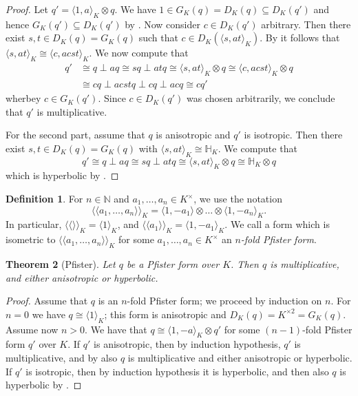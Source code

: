 \documentclass[12pt, leqno, british]{amsart}
\theoremstyle{definition}
\newtheorem{defi}{Definition}[subsection]
\theoremstyle{plain}
\newtheorem{thm}[defi]{Theorem}
\theoremstyle{remark}
\newcommand{\mbb}{\mathbb}
\newcommand{\nat}{\mbb N}
\newcommand{\llangle}{\langle\!\langle}
\newcommand{\rrangle}{\rangle\!\rangle}
\begin{document}
\begin{proof}
Let $q' = \langle 1, a \rangle_K \otimes q$. We have $1 \in G_K(q) = D_K(q) \subseteq D_K(q')$ and hence $G_K(q') \subseteq D_K(q')$ by .
Now consider $c \in D_K(q')$ arbitrary.
Then there exist $s, t \in D_K(q) = G_K(q)$ such that $c \in D_K(\langle s, at \rangle_K)$.
By  it follows that $\langle s, at \rangle_K \cong \langle c, acst \rangle_K$.
We now compute that
\begin{align*}
q' &\cong q \perp a q \cong sq \perp atq \cong \langle s, at \rangle_K \otimes q \cong \langle c, acst \rangle_K \otimes q \\
&\cong cq \perp acstq \perp cq \perp acq \cong cq'
\end{align*}
wherbey $c \in G_K(q')$.
Since $c \in D_K(q')$ was chosen arbitrarily, we conclude that $q'$ is multiplicative.

For the second part, assume that $q$ is anisotropic and $q'$ is isotropic.
Then there exist $s, t \in D_K(q) = G_K(q)$ with $\langle s, at \rangle_K \cong \mbb{H}_K$.
We compute that
$$ q' \cong q \perp aq \cong sq \perp atq \cong \langle s, at \rangle_K \otimes q \cong \mbb{H}_K \otimes q $$
which is hyperbolic by .
\end{proof}
\begin{defi}
For $n \in \nat$ and $a_1, \ldots, a_n \in K^\times$, we use the notation
$$ \llangle a_1, \ldots, a_n \rrangle_K = \langle 1, -a_1 \rangle \otimes \ldots \otimes \langle 1, -a_n \rangle_K. $$
In particular, $\llangle \rrangle_K = \langle 1 \rangle_K$, and $\llangle a_1 \rrangle_K = \langle 1, -a_1 \rangle_K$.
We call a form which is isometric to $\llangle a_1, \ldots, a_n \rrangle_K$ for some $a_1, \ldots, a_n \in K^\times$ an \emph{$n$-fold Pfister form}.
\end{defi}
\begin{thm}[Pfister]\label{T:Pfister-forms}
Let $q$ be a Pfister form over $K$.
Then $q$ is multiplicative, and either anisotropic or hyperbolic.
\end{thm}
\begin{proof}
Assume that $q$ is an $n$-fold Pfister form; we proceed by induction on $n$.
For $n = 0$ we have $q \cong \langle 1 \rangle_K$; this form is anisotropic and $D_K(q) = K^{\times 2} = G_K(q)$.
Assume now $n > 0$.
We have that $q \cong \langle 1, -a \rangle_K \otimes q'$ for some $(n-1)$-fold Pfister form $q'$ over $K$.
If $q'$ is anisotropic, then by induction hypothesis, $q'$ is multiplicative, and by  also $q$ is multiplicative and either anisotropic or hyperbolic.
If $q'$ is isotropic, then by induction hypothesis it is hyperbolic, and then also $q$ is hyperbolic by .
\end{proof}
\end{document}
